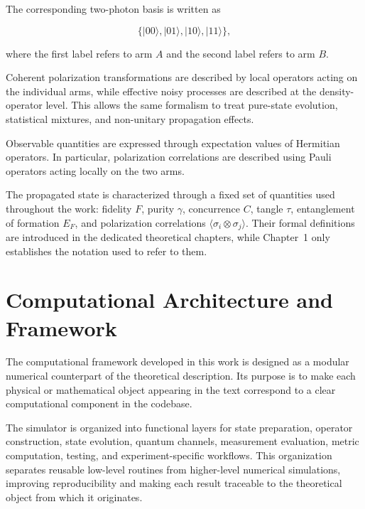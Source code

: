 The corresponding two-photon basis is written as

\[
\{
|00\rangle,
|01\rangle,
|10\rangle,
|11\rangle
\},
\]

where the first label refers to arm \( A \) and the second label refers to arm \( B \).

\medskip

Coherent polarization transformations are described by local operators acting on the individual arms, while effective noisy processes are described at the density-operator level. This allows the same formalism to treat pure-state evolution, statistical mixtures, and non-unitary propagation effects.

\medskip

Observable quantities are expressed through expectation values of Hermitian operators. In particular, polarization correlations are described using Pauli operators acting locally on the two arms.

\medskip

The propagated state is characterized through a fixed set of quantities used throughout the work: fidelity \( F \), purity \( \gamma \), concurrence \( C \), tangle \( \tau \), entanglement of formation \( E_F \), and polarization correlations \( \langle \sigma_i \otimes \sigma_j \rangle \). Their formal definitions are introduced in the dedicated theoretical chapters, while Chapter~1 only establishes the notation used to refer to them.


\section{Computational Architecture and Framework}

The computational framework developed in this work is designed as a modular numerical counterpart of the theoretical description. Its purpose is to make each physical or mathematical object appearing in the text correspond to a clear computational component in the codebase.

\medskip

The simulator is organized into functional layers for state preparation, operator construction, state evolution, quantum channels, measurement evaluation, metric computation, testing, and experiment-specific workflows. This organization separates reusable low-level routines from higher-level numerical simulations, improving reproducibility and making each result traceable to the theoretical object from which it originates.

